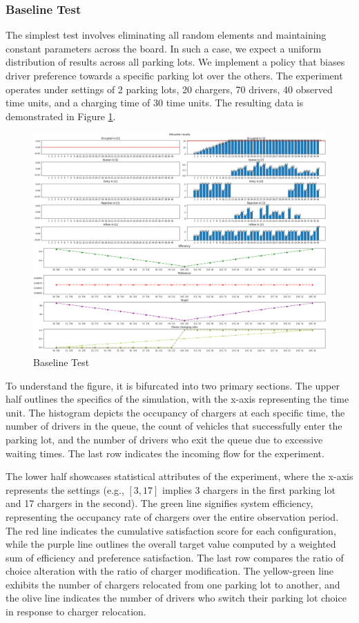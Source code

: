 \subsubsection{Baseline Test}
The simplest test involves eliminating all random elements and maintaining constant parameters across the board. In such a case, we expect a uniform distribution of results across all parking lots. We implement a policy that biases driver preference towards a specific parking lot over the others. The experiment operates under settings of 2 parking lots, 20 chargers, 70 drivers, 40 observed time units, and a charging time of 30 time units. The resulting data is demonstrated in Figure \ref{fig:baseline}.

\begin{figure}[htbp]
    \centering
    \includegraphics[width=\textwidth]{figure/baseline.png}
    \caption{Baseline Test}
    \label{fig:baseline}
\end{figure}

To understand the figure, it is bifurcated into two primary sections. The upper half outlines the specifics of the simulation, with the x-axis representing the time unit. The histogram depicts the occupancy of chargers at each specific time, the number of drivers in the queue, the count of vehicles that successfully enter the parking lot, and the number of drivers who exit the queue due to excessive waiting times. The last row indicates the incoming flow for the experiment.

The lower half showcases statistical attributes of the experiment, where the x-axis represents the settings (e.g., $[3,17]$ implies 3 chargers in the first parking lot and 17 chargers in the second). The green line signifies system efficiency, representing the occupancy rate of chargers over the entire observation period. The red line indicates the cumulative satisfaction score for each configuration, while the purple line outlines the overall target value computed by a weighted sum of efficiency and preference satisfaction. The last row compares the ratio of choice alteration with the ratio of charger modification. The yellow-green line exhibits the number of chargers relocated from one parking lot to another, and the olive line indicates the number of drivers who switch their parking lot choice in response to charger relocation.

